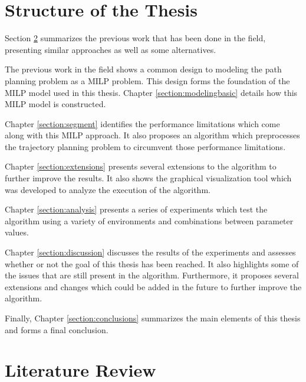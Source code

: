 
\section{Structure of the Thesis}
Section \ref{subsec:previous} summarizes the previous work that has been done in the field, presenting similar approaches as well as some  alternatives.
\par
The previous work in the field shows a common design to modeling the path planning problem as a MILP problem. This design forms the foundation of the MILP model used in this thesis. Chapter \ref{section:modelingbasic} details how this MILP model is constructed.
\par
Chapter \ref{section:segment} identifies the performance limitations which come along with this MILP approach. It also proposes an algorithm which preprocesses the trajectory planning problem to circumvent those performance limitations.
\par
Chapter \ref{section:extensions} presents several extensions to the algorithm to further improve the results. It also shows the graphical visualization tool which was developed to analyze the execution of the algorithm.
\par
Chapter \ref{section:analysis} presents a series of experiments which test the algorithm using a variety of environments and combinations between parameter values.
\par
Chapter \ref{section:discussion} discusses the results of the experiments and assesses whether or not the goal of this thesis has been reached. It also highlights some of the issues that are still present in the algorithm. Furthermore, it proposes several extensions and changes which could be added in the future to further improve the algorithm.
\par
Finally, Chapter \ref{section:conclusions} summarizes the main elements of this thesis and forms a final conclusion.

\section{Literature Review}
\label{subsec:previous}


